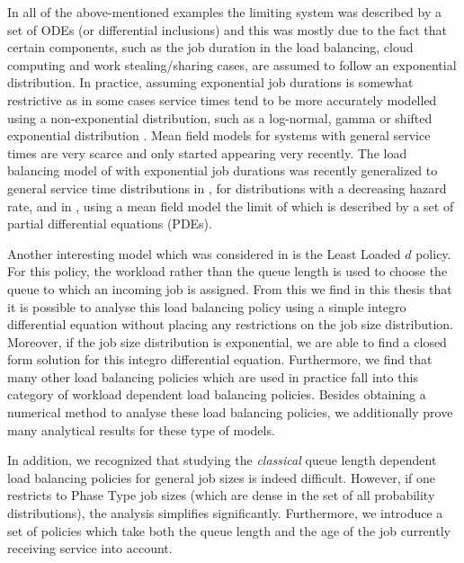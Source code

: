 \documentclass[12pt]{report}
\begin{document}
In all of the above-mentioned examples the limiting system was described by a set of ODEs (or differential inclusions) and this was mostly due to the fact that certain components, such as the job duration in the load
balancing, cloud computing and work stealing/sharing cases, are assumed to follow an exponential
distribution. In practice, assuming exponential job durations is somewhat restrictive as in some
cases service times tend to be more accurately modelled using a non-exponential distribution, such
as a log-normal, gamma or shifted exponential distribution \cite{aghajani1}. Mean field models for
systems with general service times are very scarce and only started appearing very recently. The
load balancing model of \cite{vvedenskaya3, mitzenmacher2001power} with exponential job durations was
recently generalized to general service time distributions in \cite{bramson2012asymptotic}, for
distributions with a decreasing hazard rate, and in \cite{aghajani1}, using a mean field model the limit of which is described by a set of partial differential equations (PDEs).

Another interesting model which was considered in \cite{bramson2012asymptotic} is the Least Loaded $d$ policy. For this policy, the workload rather than the queue length is used to choose the queue to which an incoming job is assigned. From this we find in this thesis that it is possible to analyse this load balancing policy using a simple integro differential equation without placing any restrictions on the job size distribution. Moreover, if the job size distribution is exponential, we are able to find a closed form solution for this integro differential equation. Furthermore, we find that many other load balancing policies which are used in practice fall into this category of workload dependent load balancing policies. Besides obtaining a numerical method to analyse these load balancing policies, we additionally prove many analytical results for these type of models.

In addition, we recognized that studying the \textit{classical} queue length dependent load balancing policies for general job sizes is indeed difficult. However, if one restricts to Phase Type job sizes (which are dense in the set of all probability distributions), the analysis simplifies significantly. Furthermore, we introduce a set of policies which take both the queue length and the age of the job currently receiving service into account.
\end{document}
